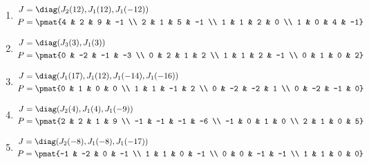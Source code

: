 \begin{enumerate}
\item

\begin{align*}
J &= \diag(J_{2}(12), J_{1}(12), J_{1}(-12))\\
P &= \pmat{4 & 2 & 9 & -1 \\ 2 & 1 & 5 & -1 \\ 1 & 1 & 2 & 0 \\ 1 & 0 & 4 & -1}
\end{align*}

\item

\begin{align*}
J &= \diag(J_{3}(3), J_{1}(3))\\
P &= \pmat{0 & -2 & -1 & -3 \\ 0 & 2 & 1 & 2 \\ 1 & 1 & 2 & -1 \\ 0 & 1 & 0 & 2}
\end{align*}

\item

\begin{align*}
J &= \diag(J_{1}(17), J_{1}(12), J_{1}(-14), J_{1}(-16))\\
P &= \pmat{0 & 1 & 0 & 0 \\ 1 & 1 & -1 & 2 \\ 0 & -2 & -2 & 1 \\ 0 & -2 & -1 & 0}
\end{align*}

\item

\begin{align*}
J &= \diag(J_{2}(4), J_{1}(4), J_{1}(-9))\\
P &= \pmat{2 & 2 & 1 & 9 \\ -1 & -1 & -1 & -6 \\ -1 & 0 & 1 & 0 \\ 2 & 1 & 0 & 5}
\end{align*}

\item

\begin{align*}
J &= \diag(J_{2}(-8), J_{1}(-8), J_{1}(-17))\\
P &= \pmat{-1 & -2 & 0 & -1 \\ 1 & 1 & 0 & -1 \\ 0 & 0 & -1 & -1 \\ 1 & 1 & 0 & 0}
\end{align*}


\end{enumerate}
